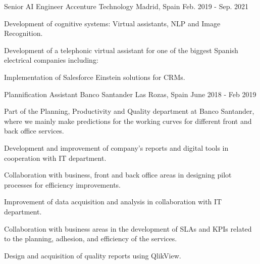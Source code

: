 \begin{cventries}
    \cventry
    {Senior AI Engineer} %
    {Accenture Technology} %
    {Madrid, Spain} %
    {Feb. 2019 - Sep. 2021} %
    {
        \begin{cvitems} %
            \item {Development of cognitive systems: Virtual assistants, NLP and Image Recognition.}
            \item {Development of a telephonic virtual assistant for one of the biggest Spanish electrical companies including: }
            \item {Implementation of Salesforce Einstein solutions for CRMs.}
        \end{cvitems}
    }

    \cventry
    {Plannification Assistant} %
    {Banco Santander} %
    {Las Rozas, Spain} %
    {June 2018 - Feb 2019} %
    {
        \begin{cvitems} %
            \item {Part of the Planning, Productivity and Quality department at Banco Santander, where we mainly make predictions for the working curves for different front and back office services.}
            \item {Development and improvement of company’s reports and digital tools in cooperation with IT department.}
            \item {Collaboration with business, front and back office areas in designing pilot processes for efficiency improvements.}
            \item {Improvement of data acquisition and analysis in collaboration with IT department.}
            \item {Collaboration with business areas in the development of SLAs and KPIs related to the planning, adhesion, and efficiency of the services.}
            \item {Design and acquisition of quality reports using QlikView.}
        \end{cvitems}
    }

\end{cventries}
